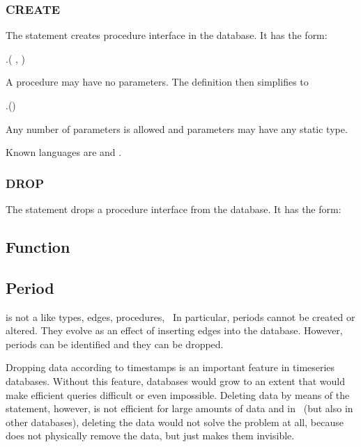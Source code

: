\subsubsection{CREATE}
The  statement
creates procedure interface in the database.
It has the form:

 .(
                            ,
                            )
                            

A procedure may have no parameters.
The definition then simplifies to

 .()
                            

Any number of parameters is allowed and parameters may have
any static type.

Known languages are  and .

\subsubsection{DROP}
The  statement
drops a procedure interface from the database.
It has the form:

 

\subsection{Function}

\subsection{Period}
 is not a 
like types, edges, procedures, \etc\
In particular, periods cannot be created or altered.
They evolve as an effect of inserting edges into
the database. However, periods can be identified
and they can be dropped.

Dropping data according to timestamps is an important
feature in timeseries databases.
Without this feature, databases would grow
to an extent that would make efficient queries difficult
or even impossible. Deleting data by means of the
 statement, however, is not efficient for large
amounts of data and in \nowdb\
(but also in other databases), deleting
the data would not solve the problem at all,
because \term{delete} does not physically remove
the data, but just makes them invisible.

